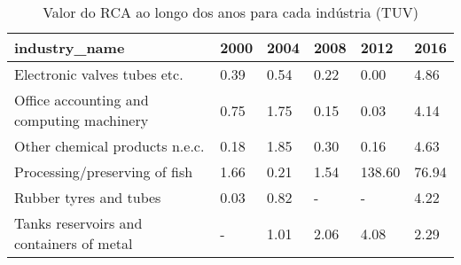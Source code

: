 \begin{table}
\centering
\caption{Valor do RCA ao longo dos anos para cada indústria (TUV)}
\begin{tabular}{p{6cm}p{1.5cm}p{1.5cm}p{1.5cm}p{1.5cm}p{1.5cm}}
\toprule
                            industry\_name & 2000 & 2004 & 2008 &   2012 &  2016 \\
\midrule
             Electronic valves tubes etc. & 0.39 & 0.54 & 0.22 &   0.00 &  4.86 \\
Office accounting and computing machinery & 0.75 & 1.75 & 0.15 &   0.03 &  4.14 \\
           Other chemical products n.e.c. & 0.18 & 1.85 & 0.30 &   0.16 &  4.63 \\
            Processing/preserving of fish & 1.66 & 0.21 & 1.54 & 138.60 & 76.94 \\
                   Rubber tyres and tubes & 0.03 & 0.82 &    - &      - &  4.22 \\
 Tanks reservoirs and containers of metal &    - & 1.01 & 2.06 &   4.08 &  2.29 \\
\bottomrule
\end{tabular}
\end{table}
